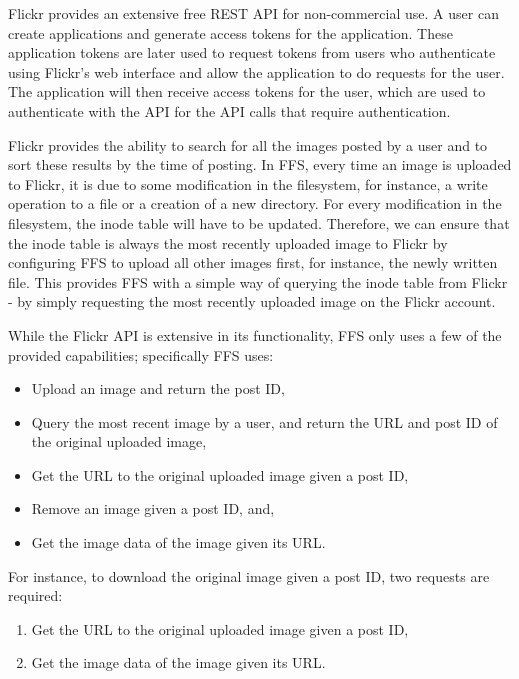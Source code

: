 Flickr provides an extensive free REST \gls{API} for \mbox{non-commercial} use. A user can create applications and generate access tokens for the application. These application tokens are later used to request tokens from users who authenticate using Flickr's web interface and allow the application to do requests for the user. The application will then receive access tokens for the user, which are used to authenticate with the \gls{API} for the \gls{API} calls that require authentication.

Flickr provides the ability to search for all the images posted by a user and to sort these results by the time of posting. In \gls{FFS}, every time an image is uploaded to Flickr, it is due to some modification in the filesystem, for instance, a write operation to a file or a creation of a new directory. For every modification in the filesystem, the inode table will have to be updated. Therefore, we can ensure that the inode table is always the most recently uploaded image to Flickr by configuring \gls{FFS} to upload all other images first, for instance, the newly written file. This provides \gls{FFS} with a simple way of querying the inode table from Flickr - by simply requesting the most recently uploaded image on the Flickr account.

While the Flickr \gls{API} is extensive in its functionality, \gls{FFS} only uses a few of the provided capabilities; specifically \gls{FFS} uses:
\begin{itemize}
	\item Upload an image and return the post ID,
	\item Query the most recent image by a user, and return the URL and post ID of the original uploaded image,
	\item Get the URL to the original uploaded image given a post ID,
	\item Remove an image given a post ID, and,
	\item Get the image data of the image given its URL.
\end{itemize}

For instance, to download the original image given a post ID, two requests are required:
\begin{enumerate}
	\item Get the URL to the original uploaded image given a post ID,
	\item Get the image data of the image given its URL.
\end{enumerate}

